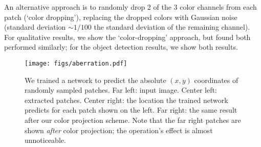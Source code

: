 \documentclass[10pt,twocolumn,letterpaper]{article}
\begin{document}
An alternative approach is to randomly drop 2 of the 3 color channels from each patch (`color dropping'), replacing the dropped colors with Gaussian noise (standard deviation $\sim 1/100$ the standard deviation of the remaining channel). For qualitative results, we show the `color-dropping' approach, but found both performed similarly; for the object detection results, we show both results.

\begin{figure*}[t]
\begin{center}
   \texttt{[image: figs/aberration.pdf]}
\end{center}
    \vspace{-0.2in}
   \caption{
    We trained a network to predict the absolute $(x,y)$ coordinates of randomly sampled patches.
    Far left: input image. %
    Center left: extracted patches.
    Center right: the location the trained network predicts for each patch shown on the left.  Far right: the same result after our color projection scheme.  Note that the far right patches are shown \textit{after} color projection; the operation's effect is almost unnoticeable.
    }
    \vspace{-0.2in}
\label{fig:aberration}
\end{figure*}
\end{document}
